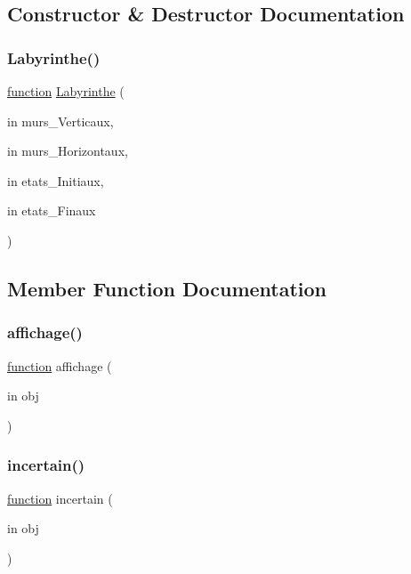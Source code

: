 \subsection{Constructor \& Destructor Documentation}
\mbox{\label{class_labyrinthe_a6fffd8c87c9756d8d7b18294daa29ca5}} 
\subsubsection{\texorpdfstring{Labyrinthe()}{Labyrinthe()}}
{\footnotesize\ttfamily \hyperlink{_plan__desuma_functions_8m_ac2ffb26d6f42d3bbcd7847b0873403f4}{function} \hyperlink{class_labyrinthe}{Labyrinthe} (\begin{DoxyParamCaption}\item[{in}]{murs\+\_\+\+Verticaux,  }\item[{in}]{murs\+\_\+\+Horizontaux,  }\item[{in}]{etats\+\_\+\+Initiaux,  }\item[{in}]{etats\+\_\+\+Finaux }\end{DoxyParamCaption})}



\subsection{Member Function Documentation}
\mbox{\label{class_labyrinthe_a961e73a265b479f0e68fdf4600ff9cd7}} 
\subsubsection{\texorpdfstring{affichage()}{affichage()}}
{\footnotesize\ttfamily \hyperlink{_plan__desuma_functions_8m_ac2ffb26d6f42d3bbcd7847b0873403f4}{function} affichage (\begin{DoxyParamCaption}\item[{in}]{obj }\end{DoxyParamCaption})}

\mbox{\label{class_labyrinthe_a6ca8be288490170254d0df6579a59ee3}} 
\subsubsection{\texorpdfstring{incertain()}{incertain()}}
{\footnotesize\ttfamily \hyperlink{_plan__desuma_functions_8m_ac2ffb26d6f42d3bbcd7847b0873403f4}{function} incertain (\begin{DoxyParamCaption}\item[{in}]{obj }\end{DoxyParamCaption})}

